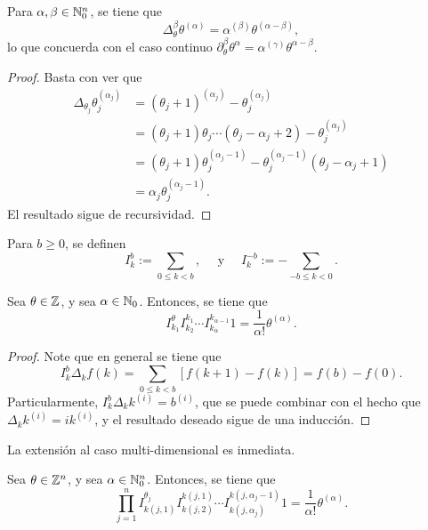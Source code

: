 \begin{proposition}
	Para $\alpha,\beta\in\mathbb{N}_0^n$, se tiene que 
	\begin{equation*}
		\Delta^\beta_\theta \theta^{(\alpha)} = \alpha^{(\beta)}\theta^{(\alpha-\beta)},
	\end{equation*}
	lo que concuerda con el caso continuo $\partial^\beta_\theta \theta^\alpha = \alpha^{(\gamma)}\theta^{\alpha-\beta}$.
\end{proposition}
\begin{proof}
	Basta con ver que 
	\begin{align*}
		\Delta_{\theta_j} \theta_j^{(\alpha_j)} &= (\theta_j+1)^{(\alpha_j)} - \theta_j^{(\alpha_j)} \\
		& = (\theta_j+1)\theta_j \cdots(\theta_j - \alpha_j+2) - \theta_j^{(\alpha_j)} \\
		& = (\theta_j+1)\theta_j^{(\alpha_j-1)} - \theta_j^{(\alpha_j-1)}(\theta_j - \alpha_j + 1) \\
		& = \alpha_j \theta_j^{(\alpha_j-1)}.
	\end{align*}
	El resultado sigue de recursividad.
\end{proof}
\begin{definition}
	Para $b\geq0$, se definen
	\begin{equation*}
		I^b_k := \sum_{0\leq k<b}, \quad \text{ y } \quad I^{-b}_k := -\sum_{-b\leq k < 0}.
	\end{equation*}
\end{definition}
\begin{theorem}
	Sea $\theta\in\mathbb{Z}$, y sea $\alpha\in\mathbb{N}_0$. Entonces, se tiene que
	\begin{equation*}
		I^\theta_{k_1}I^{k_1}_{k_2} \cdots I^{k_{\alpha-1}}_{k_\alpha} 1 = \frac{1}{\alpha!} \theta^{(\alpha)}.
	\end{equation*}
\end{theorem}
\begin{proof}
	Note que en general se tiene que
	\begin{equation*}
		I^b_k\Delta_k f(k) = \sum_{0\leq k<b} [f(k+1)- f(k)] = f(b) - f(0).
	\end{equation*}
	Particularmente, $I^b_k\Delta_k k^{(i)} = b^{(i)}$, que se puede combinar con el hecho que $\Delta_kk^{(i)}=ik^{(i)}$, y el resultado deseado sigue de una inducción.
\end{proof}
La extensión al caso multi-dimensional es inmediata. 
\begin{corollary}
	Sea $\theta\in\mathbb{Z}^n$, y sea $\alpha\in\mathbb{N}_0^n$. Entonces, se tiene que
	\begin{equation*}
		\prod_{j=1}^n I^{\theta_j}_{k(j, 1)} I^{k(j, 1)}_{k(j, 2)} \cdots I^{k(j, \alpha_j-1)}_{k(j, \alpha_j)} 1 = \frac{1}{\alpha!}\theta^{(\alpha)}.
	\end{equation*}
\end{corollary}
